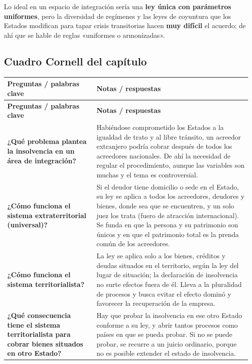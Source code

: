 \documentclass[12pt,oneside]{book}
\begin{document}
\begin{important}
Lo ideal en un espacio de integración sería una \textbf{ley única con parámetros uniformes}, pero la diversidad de regímenes y las leyes de coyuntura que los Estados modifican para tapar crisis transitorias hacen \textbf{muy difícil} el acuerdo; de ahí que se hable de reglas «uniformes o armonizadas».
\end{important}

\subsection*{Cuadro Cornell del capítulo}

\begin{longtable}{>{\raggedright\arraybackslash}p{} >{\raggedright\arraybackslash}p{}}
\toprule
\textbf{Preguntas / palabras clave} & \textbf{Notas / respuestas} \\
\midrule
\endfirsthead
\toprule
\textbf{Preguntas / palabras clave} & \textbf{Notas / respuestas} \\
\midrule
\endhead
\bottomrule
\endlastfoot

\textbf{¿Qué problema plantea la insolvencia en un área de integración?} &
Habiéndose comprometido los Estados a la igualdad de trato y al libre tránsito, un acreedor extranjero podría cobrar después de todos los acreedores nacionales. De ahí la necesidad de regular el procedimiento, aunque las variables son muchas y el tema es controversial. \\

\textbf{¿Cómo funciona el sistema extraterritorial (universal)?} &
Si el deudor tiene domicilio o sede en el Estado, su ley se aplica a todos los acreedores, deudores y bienes, donde sea que se encuentren, y un solo juez los trata (fuero de atracción internacional). Se funda en que la persona y su patrimonio son únicos y en que el patrimonio total es la prenda común de los acreedores. \\

\textbf{¿Cómo funciona el sistema territorialista?} &
La ley se aplica solo a los bienes, créditos y deudas situados en el territorio, según la ley del lugar de situación; la declaración de insolvencia no surte efectos fuera de él. Lleva a la pluralidad de procesos y busca evitar el efecto dominó y favorecer la recuperación de la empresa. \\

\textbf{¿Qué consecuencia tiene el sistema territorialista para cobrar bienes situados en otro Estado?} &
Hay que probar la insolvencia en ese otro Estado conforme a su ley, y abrir tantos procesos como países en que se pueda probar. Si no se puede probar, se recurre a un juicio ordinario, porque no es posible extender el estado de insolvencia. \\


\end{longtable}
\end{document}
